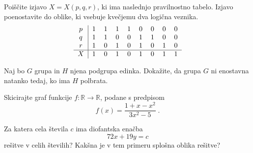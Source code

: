 \documentclass{izpit}
\begin{document}
\naloga[\tocke{20}]

  \podnaloga[15]
    Poiščite izjavo $X = X(p, q, r)$, ki ima naslednjo pravilnostno tabelo.
    Izjavo poenostavite do oblike, ki vsebuje kvečjemu dva logična veznika.
    \[
      \begin{tabular}{c|cccccccc}
        $p$ & 1 & 1 & 1 & 1 & 0 & 0 & 0 & 0 \\
        $q$ & 1 & 1 & 0 & 0 & 1 & 1 & 0 & 0 \\
        $r$ & 1 & 0 & 1 & 0 & 1 & 0 & 1 & 0 \\\hline
        $X$ & 1 & 0 & 1 & 0 & 1 & 0 & 1 & 1 \\
      \end{tabular}
    \]
  
  \prostor[2] %

  \podnaloga[5]
    Naj bo $G$ grupa in $H$ njena podgrupa edinka. Dokažite, da grupa $G$ ni
    enostavna natanko tedaj, ko ima $H$ polbrata.

  \prostor

\naloga[\tocke{16}]
  Skicirajte graf funkcije $f \colon \mathbb{R} \to \mathbb{R}$, podane s
  predpisom
  \[
    f(x) = \frac{1 + x - x^2}{3 x^2 - 5} \;.
  \]

  \dodatek{}


  Za katera cela števila $c$ ima diofantska enačba
  \[
    72 x + 19 y = c
  \]
  rešitve v celih številih? Kakšna je v tem primeru splošna oblika rešitve?
\end{document}
